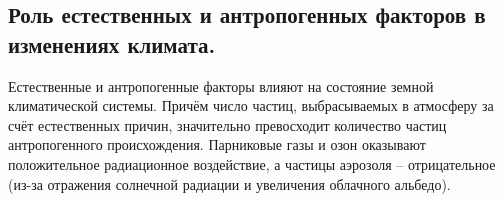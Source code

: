 \subsection{Роль естественных и антропогенных факторов в изменениях климата.}
Естественные и антропогенные факторы влияют на состояние земной климатической системы.
Причём число частиц, выбрасываемых в атмосферу за счёт естественных причин, значительно превосходит количество частиц антропогенного происхождения.
Парниковые газы и озон оказывают положительное радиационное воздействие, а частицы аэрозоля -- отрицательное (из-за отражения солнечной радиации и увеличения облачного альбедо).
